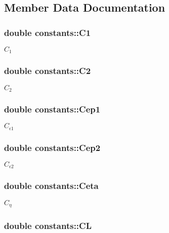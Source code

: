 \subsection{Member Data Documentation}
\hypertarget{structconstants_ad28e357065ee396d1ea2294f866e9c5b}{
\subsubsection[{C1}]{\setlength{\rightskip}{0pt plus 5cm}double {\bf constants::C1}}}
\label{structconstants_ad28e357065ee396d1ea2294f866e9c5b}
$C_1$ \hypertarget{structconstants_a3f85ef7fcf04220babce769a49e0b927}{
\subsubsection[{C2}]{\setlength{\rightskip}{0pt plus 5cm}double {\bf constants::C2}}}
\label{structconstants_a3f85ef7fcf04220babce769a49e0b927}
$C_2$ \hypertarget{structconstants_a60f29932f9847bce524357661aa5387f}{
\subsubsection[{Cep1}]{\setlength{\rightskip}{0pt plus 5cm}double {\bf constants::Cep1}}}
\label{structconstants_a60f29932f9847bce524357661aa5387f}
$C_{\epsilon 1}$ \hypertarget{structconstants_a28b0b323e3b3173072a5eaf2f89c8a1d}{
\subsubsection[{Cep2}]{\setlength{\rightskip}{0pt plus 5cm}double {\bf constants::Cep2}}}
\label{structconstants_a28b0b323e3b3173072a5eaf2f89c8a1d}
$C_{\epsilon 2}$ \hypertarget{structconstants_ae8cf7b40da68d2ee9f12f6c0c6cc49cc}{
\subsubsection[{Ceta}]{\setlength{\rightskip}{0pt plus 5cm}double {\bf constants::Ceta}}}
\label{structconstants_ae8cf7b40da68d2ee9f12f6c0c6cc49cc}
$C_{\eta}$ \hypertarget{structconstants_a34749e68de59046dca2df37cc428d07c}{
\subsubsection[{CL}]{\setlength{\rightskip}{0pt plus 5cm}double {\bf constants::CL}}}
